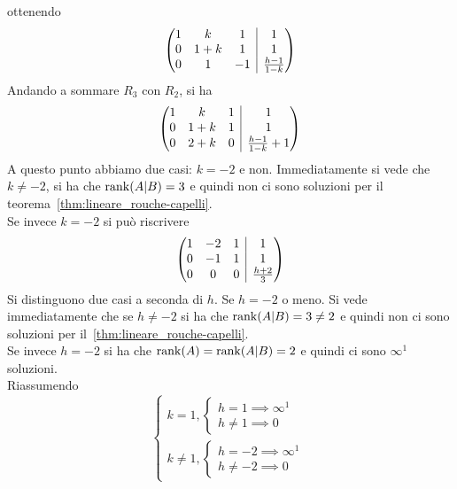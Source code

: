 ottenendo
\begin{equation*}
  \left(
    \begin{array}{@{}ccc|c@{}}
    1 & k & 1 & 1\\
    0 & 1+k & 1 & 1\\
    0 & 1 & -1 & \frac{h-1}{1-k}
    \end{array}
  \right)
\end{equation*}
Andando a sommare $R_3$ con $R_2$, si ha
\begin{equation*}
  \left(
    \begin{array}{@{}ccc|c@{}}
    1 & k & 1 & 1\\
    0 & 1+k & 1 & 1\\
    0 & 2+k & 0 & \frac{h-1}{1-k}+1
    \end{array}
  \right)
\end{equation*}
A questo punto abbiamo due casi: $k=-2$ e non. Immediatamente si vede che $k\neq-2$, si
ha che $\rank(A\vert B) = 3$ e quindi non ci sono soluzioni per il
teorema~\autoref{thm:lineare_rouche-capelli}.\\
Se invece $k=-2$ si può riscrivere
\begin{equation*}
  \left(
    \begin{array}{@{}ccc|c@{}}
      1 & -2 & 1 & 1\\
      0 & -1 & 1 & 1\\
      0 & 0 & 0 & \frac{h+2}{3}
    \end{array}
  \right)
\end{equation*}
Si distinguono due casi a seconda di $h$. Se $h=-2$ o meno. Si vede immediatamente che
se $h\neq-2$ si ha che $\rank(A\vert B)=3\neq2$ e quindi non ci sono soluzioni per
il~\autoref{thm:lineare_rouche-capelli}.\\
Se invece $h=-2$ si ha che $\rank(A) = \rank(A\vert B) = 2$ e quindi ci sono $\infty^1$
soluzioni.\\
Riassumendo
\begin{equation*}
  \begin{cases}
    k=1,
    \begin{cases}
      h=1\implies\infty^1\\
      h\neq 1\implies 0
    \end{cases}\\
    k\neq1,
    \begin{cases}
      h=-2\implies\infty^1\\
      h\neq-2\implies 0
    \end{cases}
  \end{cases}
\end{equation*}
